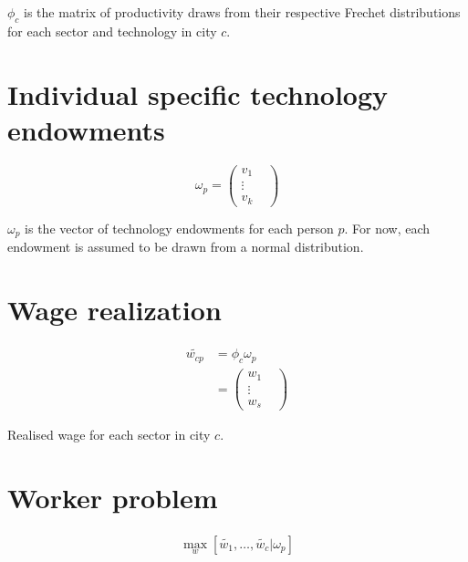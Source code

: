 \documentclass[10pt]{article}
\begin{document}
$\phi_c$ is the matrix of productivity draws from their respective Frechet distributions for each sector and technology in city $c$.

\section{Individual specific technology endowments}

\begin{equation}
    \omega_p =
    \begin{pmatrix}
        v_{1}  & \\
        \vdots & \\
        v_{k}  &
    \end{pmatrix}
\end{equation}

$\omega_p$ is the vector of technology endowments for each person $p$. For now, each endowment is assumed to be drawn from a normal distribution.

\section{Wage realization}

\begin{align}
    \tilde{w_{cp}} & = \phi_c \omega_p \\
                   & = \begin{pmatrix}
                           w_{1}  & \\
                           \vdots & \\
                           w_{s}  &
                       \end{pmatrix}
\end{align}

Realised wage for each sector in city $c$.

\section{Worker problem}

\begin{align}
    \max_{w} [\tilde{w_1}, \dots, \tilde{w_c} | \omega_p]
\end{align}
\end{document}
